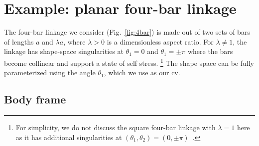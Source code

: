 

\section{Example: planar four-bar linkage}
\label{sec:4bar}

The four-bar linkage we consider (Fig.~\ref{fig:4bar}) is made out of two sets of bars of lengths $a$ and $\lambda a$, where $\lambda > 0$ is a dimensionless aspect ratio.
For $\lambda \ne 1$, the linkage has shape-space singularities at $\theta_{1} = 0$ and $\theta_{1} = \pm \pi$ where the bars become collinear and support a state of self stress.%
\footnote{For simplicity, we do not discuss the square four-bar linkage with $\lambda=1$ here as it has additional singularities at $(\theta_{1}, \theta_{2}) = (0, \pm\pi)$~\cite{yang1994}.}
The shape space can be fully parameterized using the angle $\theta_{1}$, which we use as our \ac{cv}.

\subsection{Body frame}

